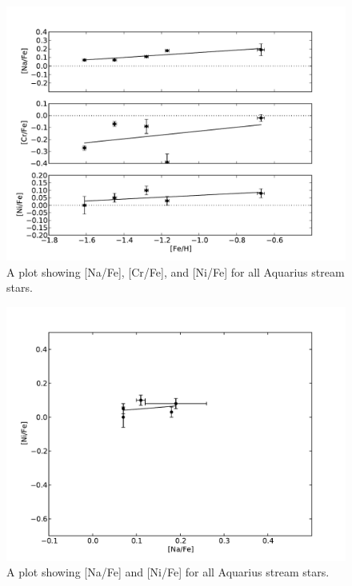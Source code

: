 \documentclass{emulateapj}
\begin{document}
\begin{figure}[h]
	\includegraphics[width=\columnwidth]{./figures/aquarius-na-cr-ni-fe.pdf}
	\caption{A plot showing [Na/Fe], [Cr/Fe], and [Ni/Fe] for all Aquarius stream stars.}
	\label{fig:na-cr-ni-fe}
\end{figure}

\begin{figure}[h]
	\includegraphics[width=\columnwidth]{./figures/aquarius-na-ni.pdf}
	\caption{A plot showing [Na/Fe] and [Ni/Fe] for all Aquarius stream stars.}
	\label{fig:na-ni}
\end{figure}
\end{document}
